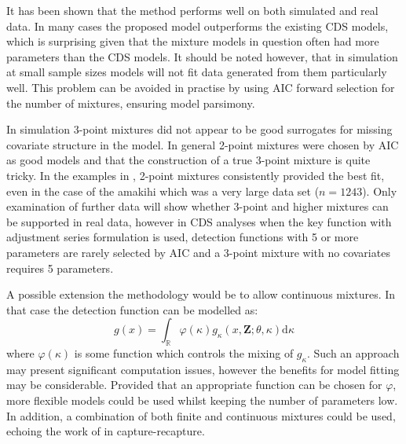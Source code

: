It has been shown that the method performs well on both simulated and real data. In many cases the proposed model outperforms the existing CDS models, which is surprising given that the mixture models in question often had more parameters than the CDS models. It should be noted however, that in simulation at small sample sizes models will not fit data generated from them particularly well. This problem can be avoided in practise by using AIC forward selection for the number of mixtures, ensuring model parsimony.

In simulation 3-point mixtures did not appear to be good surrogates for missing covariate structure in the model. In general 2-point mixtures were chosen by AIC as good models and that the construction of a true 3-point mixture is quite tricky. In the examples in , 2-point mixtures consistently provided the best fit, even in the case of the amakihi which was a very large data set ($n=1243$). Only examination of further data will show whether 3-point and higher mixtures can be supported in real data, however in CDS analyses when the key function with adjustment series formulation is used, detection functions with 5 or more parameters are rarely selected by AIC and a 3-point mixture with no covariates requires 5 parameters.

A possible extension the methodology would be to allow continuous mixtures. In that case the detection function can be modelled as:
\begin{equation*}
g(x) = \int_\mathbb{R} \varphi(\kappa) g_\kappa(x,\mathbf{Z}; \theta, \kappa) \text{d}\kappa
\end{equation*}
where $\varphi(\kappa)$ is some function which controls the mixing of $g_\kappa$. Such an approach may present significant computation issues, however the benefits for model fitting may be considerable. Provided that an appropriate function can be chosen for $\varphi$, more flexible models could be used whilst keeping the number of parameters low. In addition, a combination of both finite and continuous mixtures could be used, echoing the work of  in capture-recapture.

